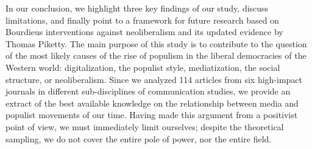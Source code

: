 \documentclass{tufte-handout}
\begin{document}
{{{{In our conclusion, we highlight three key findings of our study, discuss
limitations, and finally point to a framework for future research based
on Bourdieu\textquotesingle s interventions against neoliberalism and
its updated evidence by Thomas Piketty. The main purpose of this study
is to contribute to the question of the most likely causes of the rise
of populism in the liberal democracies of the Western world:
digitalization, the populist style, mediatization, the social structure,
or neoliberalism. Since we analyzed 114 articles from six high-impact
journals in different sub-disciplines of communication studies, we
provide an extract of the best available knowledge on the relationship
between media and populist movements of our time. Having made this
argument from a positivist point of view, we must immediately limit
ourselves; despite the theoretical sampling, we do not cover the entire
pole of power, nor the entire field.

}}}}
\end{document}
